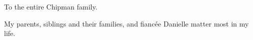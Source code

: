 To the entire Chipman family.  

My parents, siblings and their families, and fianc\'{e}e Danielle matter most in my life.